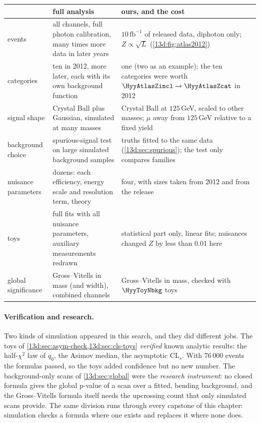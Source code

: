 \begin{center}
\small
\begin{tabular}{@{}>{\raggedright\arraybackslash}p{2.3cm}>{\raggedright\arraybackslash}p{4.3cm}>{\raggedright\arraybackslash}p{4.3cm}@{}}
\toprule
 & full analysis & ours, and the cost\\\midrule
events & all channels, full photon calibration, many times more data in later years & $10\,\mathrm{fb}^{-1}$ of released data, diphoton only; $Z\propto\sqrt L$ (\cref{13d:fig:atlas2012})\\
categories & ten in 2012, more later, each with its own background function & one (two as an example); the ten categories were worth $\HyyAtlasZincl\to\HyyAtlasZcat$ in 2012\\
signal shape & Crystal Ball plus Gaussian, simulated at many masses & Crystal Ball at $125\,$GeV, scaled to other masses; $\mu$ away from $125\,$GeV relative to a fixed yield\\
background choice & spurious-signal test on large simulated background samples & truths fitted to the same data (\cref{13d:sec:spurious}); the test only compares families\\
nuisance parameters & dozens: each efficiency, energy scale and resolution term, theory & four, with sizes taken from 2012 and from the release\\
toys & full fits with all nuisance parameters, auxiliary measurements redrawn & statistical part only, linear fits; nuisances changed $Z$ by less than $0.01$ here\\
global significance & Gross--Vitells in mass (and width), combined channels & Gross--Vitells in mass, checked with $\HyyToyNbkg$ toys\\
\bottomrule
\end{tabular}
\end{center}

\paragraph{Verification and research.}
Two kinds of simulation appeared in this search, and they did different jobs. The toys of
\cref{13d:sec:asym-check,13d:sec:cls-toys} \emph{verified} known analytic results: the
half-$\chi^2$ law of $q_0$, the Asimov median, the asymptotic CL$_s$. With $76\,000$ events
the formulas passed, so the toys added confidence but no new number. The background-only
scans of \cref{13d:sec:global} were the \emph{research instrument}: no closed formula
gives the global p-value of a scan over a fitted, bending background, and the
Gross--Vitells formula itself needs the upcrossing count that only simulated scans
provide. The same division runs through every capstone of this chapter: simulation checks
a formula where one exists and replaces it where none does.

